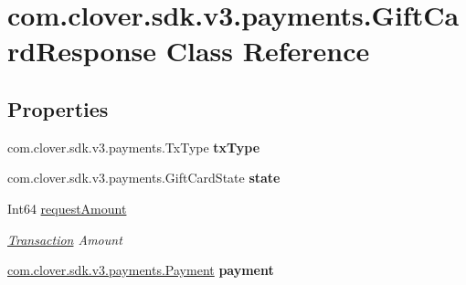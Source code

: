 \hypertarget{classcom_1_1clover_1_1sdk_1_1v3_1_1payments_1_1_gift_card_response}{}\section{com.\+clover.\+sdk.\+v3.\+payments.\+Gift\+Card\+Response Class Reference}
\label{classcom_1_1clover_1_1sdk_1_1v3_1_1payments_1_1_gift_card_response}
\subsection*{Properties}
\begin{DoxyCompactItemize}
\item 
\mbox{\label{classcom_1_1clover_1_1sdk_1_1v3_1_1payments_1_1_gift_card_response_aee1f7f1c4ee508658dd5b13cf897c640}} 
com.\+clover.\+sdk.\+v3.\+payments.\+Tx\+Type {\bfseries tx\+Type}
\item 
\mbox{\label{classcom_1_1clover_1_1sdk_1_1v3_1_1payments_1_1_gift_card_response_ad9a31e0ad1402c2f14d855f649c01d7e}} 
com.\+clover.\+sdk.\+v3.\+payments.\+Gift\+Card\+State {\bfseries state}
\item 
Int64 \hyperlink{classcom_1_1clover_1_1sdk_1_1v3_1_1payments_1_1_gift_card_response_ac8eb07f2756ebc3b1f8d91ae48ced1d2}{request\+Amount}
\begin{DoxyCompactList}\small\item\em \hyperlink{classcom_1_1clover_1_1sdk_1_1v3_1_1payments_1_1_transaction}{Transaction} Amount \end{DoxyCompactList}\item 
\mbox{\label{classcom_1_1clover_1_1sdk_1_1v3_1_1payments_1_1_gift_card_response_ac1774b85e3fc551ed28fc1e56de81725}} 
\hyperlink{classcom_1_1clover_1_1sdk_1_1v3_1_1payments_1_1_payment}{com.\+clover.\+sdk.\+v3.\+payments.\+Payment} {\bfseries payment}

\end{DoxyCompactItemize}
